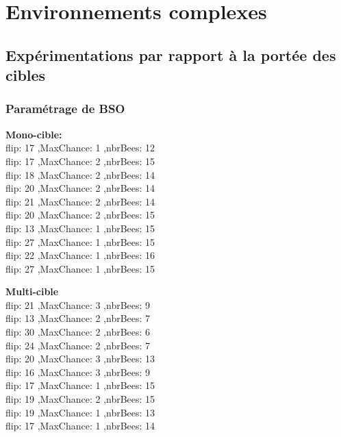 \newpage

\section{Environnements complexes}
\subsection{Expérimentations par rapport à la portée des cibles}
\subsubsection{Paramétrage de BSO} 

\noindent
\begin{minipage}[t]{0.5\textwidth}
	\textbf{Mono-cible:} \\
flip: 17 ,MaxChance: 1 ,nbrBees: 12\\
flip: 17 ,MaxChance: 2 ,nbrBees: 15\\
flip: 18 ,MaxChance: 2 ,nbrBees: 14\\
flip: 20 ,MaxChance: 2 ,nbrBees: 14\\
flip: 21 ,MaxChance: 2 ,nbrBees: 14\\
flip: 20 ,MaxChance: 2 ,nbrBees: 15\\
flip: 13 ,MaxChance: 1 ,nbrBees: 15\\
flip: 27 ,MaxChance: 1 ,nbrBees: 15\\
flip: 22 ,MaxChance: 1 ,nbrBees: 16\\
flip: 27 ,MaxChance: 1 ,nbrBees: 15\\

\end{minipage}\hfill
\hspace{0.5cm}
\begin{minipage}[t]{0.5\textwidth}
	\textbf{Multi-cible}\\
flip: 21 ,MaxChance: 3 ,nbrBees: 9\\
flip: 13 ,MaxChance: 2 ,nbrBees: 7\\
flip: 30 ,MaxChance: 2 ,nbrBees: 6\\
flip: 24 ,MaxChance: 2 ,nbrBees: 7\\
flip: 20 ,MaxChance: 3 ,nbrBees: 13\\
flip: 16 ,MaxChance: 3 ,nbrBees: 9\\
flip: 17 ,MaxChance: 1 ,nbrBees: 15\\
flip: 19 ,MaxChance: 2 ,nbrBees: 15\\
flip: 19 ,MaxChance: 1 ,nbrBees: 13\\
flip: 17 ,MaxChance: 1 ,nbrBees: 14\\

\end{minipage}\hfill




